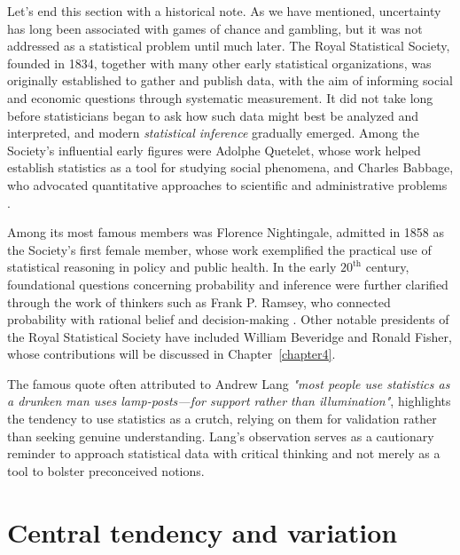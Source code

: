 \medskip

Let's end this section with a historical note. As we have mentioned, uncertainty has long been associated with games of chance and gambling, but it was not addressed as a statistical problem until much later. The Royal Statistical Society, founded in 1834, together with many other early statistical organizations, was originally established to gather and publish data, with the aim of informing social and economic questions through systematic measurement. It did not take long before statisticians began to ask how such data might best be analyzed and interpreted, and modern \textit{statistical inference} gradually emerged. Among the Society’s influential early figures were Adolphe Quetelet, whose work helped establish statistics as a tool for studying social phenomena, and Charles Babbage, who advocated quantitative approaches to scientific and administrative problems \cite{babbage_1832_economy,babbage_1830_reflections}.

Among its most famous members was Florence Nightingale, admitted in 1858 as the Society’s first female member, whose work exemplified the practical use of statistical reasoning in policy and public health. In the early $20^{\text{th}}$ century, foundational questions concerning probability and inference were further clarified through the work of thinkers such as Frank P. Ramsey, who connected probability with rational belief and decision-making \cite{ramsey_1931_foundations}. Other notable presidents of the Royal Statistical Society have included William Beveridge and Ronald Fisher, whose contributions will be discussed in Chapter~\ref{chapter4}.

\medskip

The famous quote often attributed to Andrew Lang \textit{"most people use statistics as a drunken man uses lamp-posts—for support rather than illumination"}, highlights the tendency to use statistics as a crutch, relying on them for validation rather than seeking genuine understanding. Lang's observation serves as a cautionary reminder to approach statistical data with critical thinking and not merely as a tool to bolster preconceived notions.

\section{Central tendency and variation}

